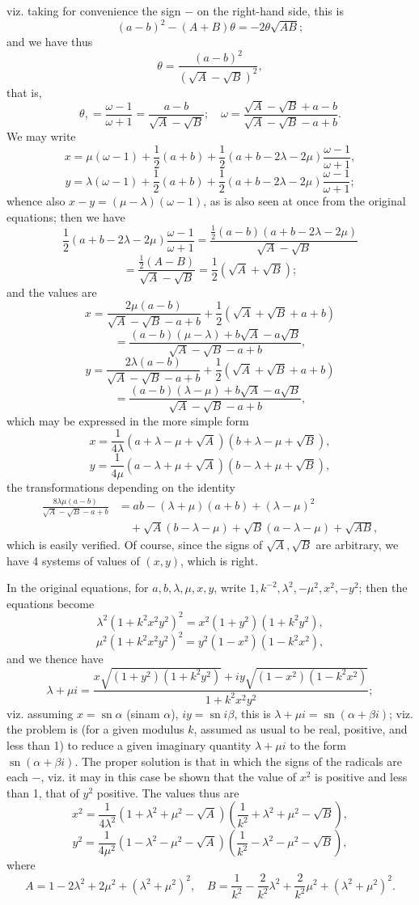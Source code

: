 \documentclass[10pt,twoside]{article}
\begin{document}
viz. taking for convenience the sign \(-\) on the right-hand side, this is
\[
(a-b)^2-(A+B)\theta=-2\theta\sqrt{AB};
\]
and we have thus
\[
\theta=\frac{(a-b)^2}{(\sqrt A-\sqrt B)^2},
\]
that is,
\[
\theta,=\frac{\omega-1}{\omega+1}=\frac{a-b}{\sqrt A-\sqrt B};
\quad
\omega=\frac{\sqrt A-\sqrt B+a-b}{\sqrt A-\sqrt B-a+b}.
\]
We may write
\[
x=\mu(\omega-1)+\frac12(a+b)
+\frac12(a+b-2\lambda-2\mu)\frac{\omega-1}{\omega+1},
\]
\[
y=\lambda(\omega-1)+\frac12(a+b)
+\frac12(a+b-2\lambda-2\mu)\frac{\omega-1}{\omega+1};
\]
whence also \(x-y=(\mu-\lambda)(\omega-1)\), as is also seen at once from the original equations; then we have
\[
\frac12(a+b-2\lambda-2\mu)\frac{\omega-1}{\omega+1}
=\frac{\frac12(a-b)(a+b-2\lambda-2\mu)}{\sqrt A-\sqrt B}
\]
\[
=\frac{\frac12(A-B)}{\sqrt A-\sqrt B}
=\frac12(\sqrt A+\sqrt B);
\]
and the values are
\[
x=\frac{2\mu(a-b)}{\sqrt A-\sqrt B-a+b}
+\frac12(\sqrt A+\sqrt B+a+b)
\]
\[
=\frac{(a-b)(\mu-\lambda)+b\sqrt A-a\sqrt B}{\sqrt A-\sqrt B-a+b},
\]
\[
y=\frac{2\lambda(a-b)}{\sqrt A-\sqrt B-a+b}
+\frac12(\sqrt A+\sqrt B+a+b)
\]
\[
=\frac{(a-b)(\lambda-\mu)+b\sqrt A-a\sqrt B}{\sqrt A-\sqrt B-a+b},
\]
which may be expressed in the more simple form
\[
x=\frac{1}{4\lambda}(a+\lambda-\mu+\sqrt A)(b+\lambda-\mu+\sqrt B),
\]
\[
y=\frac{1}{4\mu}(a-\lambda+\mu+\sqrt A)(b-\lambda+\mu+\sqrt B),
\]
\newpage
\noindent the transformations depending on the identity
\[
\begin{split}
\frac{8\lambda\mu(a-b)}{\sqrt A-\sqrt B-a+b}
&=ab-(\lambda+\mu)(a+b)+(\lambda-\mu)^2\\
&\quad+\sqrt A(b-\lambda-\mu)+\sqrt B(a-\lambda-\mu)+\sqrt{AB},
\end{split}
\]
which is easily verified. Of course, since the signs of \(\sqrt A,\sqrt B\) are arbitrary, we have 4 systems of values of \((x,y)\), which is right.

In the original equations, for \(a,b,\lambda,\mu,x,y\), write \(1,k^{-2},\lambda^2,-\mu^2,x^2,-y^2\); then the equations become
\[
\lambda^2(1+k^2x^2y^2)^2=x^2(1+y^2)(1+k^2y^2),
\]
\[
\mu^2(1+k^2x^2y^2)^2=y^2(1-x^2)(1-k^2x^2),
\]
and we thence have
\[
\lambda+\mu i=
\frac{x\sqrt{(1+y^2)(1+k^2y^2)}+iy\sqrt{(1-x^2)(1-k^2x^2)}}{1+k^2x^2y^2};
\]
viz. assuming \(x=\operatorname{sn}\alpha\) (sinam \(\alpha\)), \(iy=\operatorname{sn}i\beta\), this is \(\lambda+\mu i=\operatorname{sn}(\alpha+\beta i)\); viz. the problem is (for a given modulus \(k\), assumed as usual to be real, positive, and less than 1) to reduce a given imaginary quantity \(\lambda+\mu i\) to the form \(\operatorname{sn}(\alpha+\beta i)\). The proper solution is that in which the signs of the radicals are each \(-\), viz. it may in this case be shown that the value of \(x^2\) is positive and less than 1, that of \(y^2\) positive. The values thus are
\[
x^2=\frac{1}{4\lambda^2}(1+\lambda^2+\mu^2-\sqrt A)
\left(\frac{1}{k^2}+\lambda^2+\mu^2-\sqrt B\right),
\]
\[
y^2=\frac{1}{4\mu^2}(1-\lambda^2-\mu^2-\sqrt A)
\left(\frac{1}{k^2}-\lambda^2-\mu^2-\sqrt B\right),
\]
where
\[
A=1-2\lambda^2+2\mu^2+(\lambda^2+\mu^2)^2,\quad
B=\frac{1}{k^2}-\frac{2}{k^2}\lambda^2+\frac{2}{k^2}\mu^2+(\lambda^2+\mu^2)^2.
\]
\end{document}
